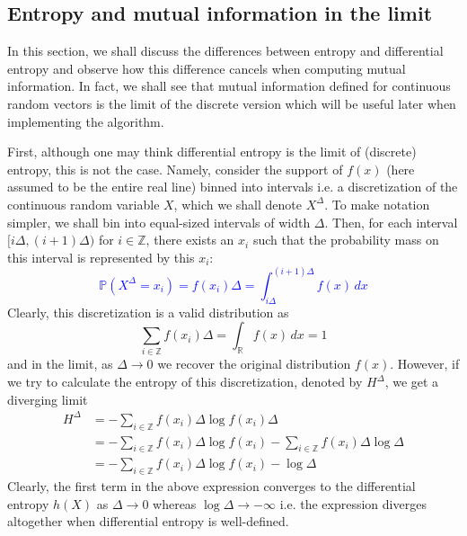 \documentclass[../Thesis.tex]{subfiles}
\begin{document}
\subsection{Entropy and mutual information in the limit}\label{subsec:limit entropy and MI}
In this section, we shall discuss the differences between entropy and differential entropy and observe how this difference cancels when computing mutual information. In fact, we shall see that mutual information defined for continuous random vectors is the limit of the discrete version which will be useful later when implementing the algorithm.

First, although one may think differential entropy is the limit of (discrete) entropy, this is not the case. Namely, consider the support of $f(x)$ (here assumed to be the entire real line) binned into intervals i.e. a discretization of the continuous random variable $X$, which we shall denote $X^{\Delta}$. To make notation simpler, we shall bin into equal-sized intervals of width $\Delta$. Then, for each interval $[i\Delta, (i+1)\Delta)$ for $i \in \mathbb{Z}$, there exists an $x_i$ such that the probability mass on this interval is represented by this $x_i$:
\textcolor{blue}{
    \begin{equation}\label{eq:one dim discretization}
        \mathbb{P}\left(X^{\Delta} = x_i\right) = f(x_i) \Delta = \int_{i\Delta}^{(i+1)\Delta} f(x) \, dx
    \end{equation}
}
Clearly, this discretization is a valid distribution as
$$\sum_{i\in\mathbb{Z}} f(x_i) \Delta = \int_{\mathbb{R}} f(x) \, dx = 1$$
and in the limit, as $\Delta \to 0$ we recover the original distribution $f(x)$. However, if we try to calculate the entropy of this discretization, denoted by $H^{\Delta}$, we get a diverging limit
\begin{align*}
    H^{\Delta} & = -\sum_{i\in\mathbb{Z}} f(x_i) \Delta \log{f(x_i) \Delta}                                             \\
               & = -\sum_{i\in\mathbb{Z}} f(x_i) \Delta \log{f(x_i)} - \sum_{i\in\mathbb{Z}} f(x_i) \Delta \log{\Delta} \\
               & = -\sum_{i\in\mathbb{Z}} f(x_i) \Delta \log{f(x_i)} - \log{\Delta}
\end{align*}
Clearly, the first term in the above expression converges to the differential entropy $h\left(X\right)$ as $\Delta \to 0$ whereas $\log{\Delta} \to - \infty$ i.e. the expression diverges altogether when differential entropy is well-defined.
\end{document}
